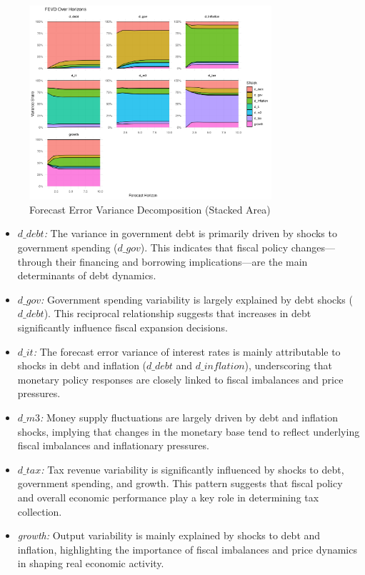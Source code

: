 \documentclass[a4paper,12pt]{article}
\begin{document}
\begin{figure}[H]
  \centering
  \includegraphics[width=0.8\textwidth]{../results/fevd_stacked_area.png}
  \caption{Forecast Error Variance Decomposition (Stacked Area)}
  \label{fig:fevd_area}
\end{figure}

\begin{itemize}
    \item \textit{\(d\_debt\):} The variance in government debt is primarily driven by shocks to government spending (\(d\_gov\)). This indicates that fiscal policy changes—through their financing and borrowing implications—are the main determinants of debt dynamics.
    
    \item \textit{\(d\_gov\):} Government spending variability is largely explained by debt shocks (\(d\_debt\)). This reciprocal relationship suggests that increases in debt significantly influence fiscal expansion decisions.
    
    \item \textit{\(d\_it\):} The forecast error variance of interest rates is mainly attributable to shocks in debt and inflation (\(d\_debt\) and \(d\_inflation\)), underscoring that monetary policy responses are closely linked to fiscal imbalances and price pressures.
    
    \item \textit{\(d\_m3\):} Money supply fluctuations are largely driven by debt and inflation shocks, implying that changes in the monetary base tend to reflect underlying fiscal imbalances and inflationary pressures.
    
    \item \textit{\(d\_tax\):} Tax revenue variability is significantly influenced by shocks to debt, government spending, and growth. This pattern suggests that fiscal policy and overall economic performance play a key role in determining tax collection.
    
    \item \textit{growth:} Output variability is mainly explained by shocks to debt and inflation, highlighting the importance of fiscal imbalances and price dynamics in shaping real economic activity.
\end{itemize}
\end{document}
